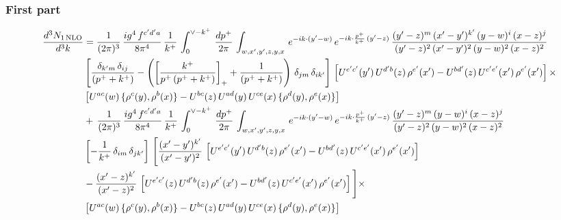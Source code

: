 \documentclass[9pt]{article}
\numberwithin{equation}{section}
\begin{document}
\subsubsection{First part}
\begin{align}
     \frac{d^{3}N_{1\,\rm NLO}}{d^{3}k} & =  \frac{1}{(2\pi)^{3}}\, \frac{ig^{4}\,f^{c'd'a}}{8\pi^{4}}\, \frac{1}{k^{+}}\,\int_{0}^{\vee-k^{+}}\,  \frac{dp^{+}}{2\pi}\, \int_{w,x',y',z,y,x}\, e^{-ik\cdot (y'-w)}\, e^{-ik\cdot \frac{p^{+}}{k^{+}}\,(y'-z)}\,\frac{(y'-z)^{m}\,(x'-y')^{k'}\,(y-w)^{i}\,(x-z)^{j}}{(y'-z)^{2}\,(x'-y')^{2}\,(y-w)^{2}\,(x-z)^{2}}\notag \\ & \left[\frac{\delta_{k'm}\,\delta_{ij}}{(p^{+}+k^{+})}-\left(\left[\frac{k^{+}}{p^{+}\,(p^{+}+k^{+})}\right]_{+}+\frac{1}{(p^{+}+k^{+})}\right)\,\delta_{jm}\,\delta_{ik'}\right]\, \left[U^{e'c'}(y')\,U^{d'b}(z)\,\rho^{e'}(x')-U^{bd'}(z)\,U^{c'e'}(x')\,\rho^{e'}(x')\right]\times\notag \\ &  \left[U^{ac}(w)\, \{\rho^{c}(y),\rho^{b}(x)\}-U^{bc}(z)\,U^{ad}(y)\,U^{ce}(x)\,\{\rho^{d}(y),\rho^{e}(x)\}\right] \notag \\
&  +\,\frac{1}{(2\pi)^{3}}\, \frac{ig^{4}\,f^{c'd'a}}{8\pi^{4}}\, \frac{1}{k^{+}}\,\int_{0}^{\vee-k^{+}}\,  \frac{dp^{+}}{2\pi}\, \int_{w,x',y',z,y,x}\, e^{-ik\cdot (y'-w)}\, e^{-ik\cdot \frac{p^{+}}{k^{+}}\,(y'-z)}\,\frac{(y'-z)^{m}\,(y-w)^{i}\,(x-z)^{j}}{(y'-z)^{2}\,(y-w)^{2}\,(x-z)^{2}}\notag \\ &   \left[-\frac{1}{k^{+}}\, \delta_{im}\, \delta_{jk'}\right]\, \Bigg[\frac{(x'-y')^{k'}}{(x'-y')^{2}}\,\left[U^{e'c'}(y')\,U^{d'b}(z)\,\rho^{e'}(x')-U^{bd'}(z)\,U^{c'e'}(x')\,\rho^{e'}(x')\right]\notag \\ & -\frac{(x'-z)^{k'}}{(x'-z)^{2}}\,\left[U^{e'c'}(z)\,U^{d'b}(z)\,\rho^{e'}(x')-U^{bd'}(z)\,U^{c'e'}(x')\,\rho^{e'}(x')\right]\Bigg]\times\notag \\ &   \left[U^{ac}(w)\, \{\rho^{c}(y),\rho^{b}(x)\}-U^{bc}(z)\,U^{ad}(y)\,U^{ce}(x)\,\{\rho^{d}(y),\rho^{e}(x)\}\right]
\end{align}
\end{document}
